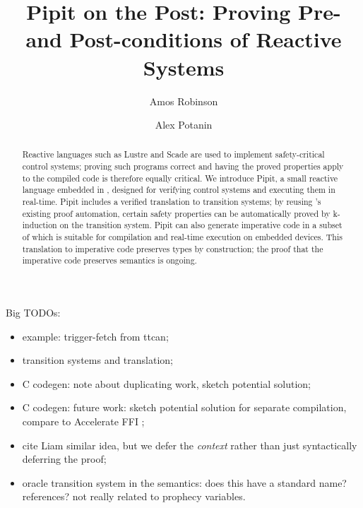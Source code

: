 \documentclass[a4paper,UKenglish,cleveref, autoref, thm-restate]{lipics-v2021}
\title{Pipit on the Post: Proving Pre- and Post-conditions of Reactive Systems}
\author{Amos Robinson}{Australian National University, Canberra, Australia}{amos.robinson@anu.edu.au}{https://orcid.org/0009-0004-4837-4981}{}
\author{Alex Potanin}{Australian National University, Canberra, Australia}{alex.potanin@anu.edu.au}{https://orcid.org/0000-0002-4242-2725}{}
\begin{document}
\maketitle

\begin{abstract}
  Reactive languages such as Lustre and Scade are used to implement safety-critical control systems; proving such programs correct and having the proved properties apply to the compiled code is therefore equally critical.
  We introduce Pipit, a small reactive language embedded in \fstar{}, designed for verifying control systems and executing them in real-time.
  Pipit includes a verified translation to transition systems; by reusing \fstar{}'s existing proof automation, certain safety properties can be automatically proved by k-induction on the transition system.
  Pipit can also generate imperative code in a subset of \fstar{} which is suitable for compilation and real-time execution on embedded devices.
  This translation to imperative code preserves types by construction; the proof that the imperative code preserves semantics is ongoing.
\end{abstract}


\makeatactive


Big TODOs:
\begin{itemize}
  \item example: trigger-fetch from ttcan;
  \item transition systems and translation;
  \item C codegen: note about duplicating work, sketch potential solution;
  \item C codegen: future work: sketch potential solution for separate compilation, compare to Accelerate FFI \cite{clifton2014embedding};
  \item cite Liam \cite{oconnor2019deferring} similar idea, but we defer the \emph{context} rather than just syntactically deferring the proof;
  \item oracle transition system in the semantics: does this have a standard name? references? not really related to prophecy variables.
\end{itemize}















\end{document}
